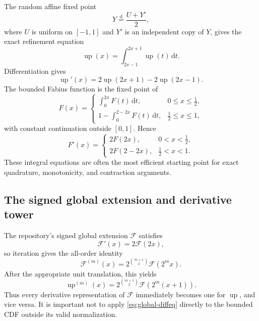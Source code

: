 \documentclass[11pt,oneside]{article}
\theoremstyle{definition}
\theoremstyle{remark}
\newcommand{\Up}{\operatorname{up}}
\newcommand{\dd}{\,\mathrm d}
\newcommand{\dist}{\mathrel{\stackrel{\mathrm d}=}}
\newcommand{\Fcal}{\mathcal F}
\begin{document}
The random affine fixed point
\begin{equation}
 Y\dist\frac{U+Y'}2,                                    \label{eq:random-fixed}
\end{equation}
where $U$ is uniform on $[-1,1]$ and $Y'$ is an independent copy of $Y$, gives the exact
refinement equation
\begin{equation}
 \boxed{\quad
 \Up(x)=\int_{2x-1}^{2x+1}\Up(t)\dd t.
 \quad}                                                  \label{eq:up-integral-refinement}
\end{equation}
Differentiation gives
\begin{equation}
 \Up'(x)=2\Up(2x+1)-2\Up(2x-1).                         \label{eq:up-differential-refinement}
\end{equation}
The bounded Fabius function is the fixed point of
\begin{equation}
 F(x)=
 \begin{cases}
 \displaystyle\int_0^{2x}F(t)\dd t,&0\le x\le\tfrac12,\\[1ex]
 \displaystyle1-\int_0^{2-2x}F(t)\dd t,&\tfrac12\le x\le1,
 \end{cases}                                            \label{eq:F-fixed}
\end{equation}
with constant continuation outside $[0,1]$.  Hence
\begin{equation}
 F'(x)=
 \begin{cases}
 2F(2x),&0<x<\tfrac12,\\
 2F(2-2x),&\tfrac12<x<1.
 \end{cases}                                            \label{eq:F-diffeq-pieces}
\end{equation}
These integral equations are often the most efficient starting point for exact quadrature,
monotonicity, and contraction arguments.

\subsection{The signed global extension and derivative tower}

The repository's signed global extension $\Fcal$ satisfies
\begin{equation}
 \Fcal'(x)=2\Fcal(2x),                                   \label{eq:global-diffeq}
\end{equation}
so iteration gives the all-order identity
\begin{equation}
 \boxed{\quad
 \Fcal^{(m)}(x)=2^{\binom{m+1}{2}}\Fcal(2^m x).
 \quad}                                                  \label{eq:global-derivative-tower}
\end{equation}
After the appropriate unit translation, this yields
\begin{equation}
 \Up^{(m)}(x)=2^{\binom{m+1}{2}}\Fcal(2^m(x+1)).         \label{eq:up-derivative-tower}
\end{equation}
Thus every derivative representation of $\Fcal$ immediately becomes one for $\Up$, and
vice versa.  It is important not to apply \eqref{eq:global-diffeq} directly to the bounded
CDF outside its valid normalization.
\end{document}
